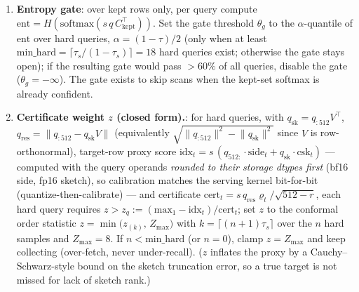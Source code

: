 \documentclass[11pt]{article}
\newcommand{\kept}{\mathrm{kept}}
\begin{document}
\begin{enumerate}[itemsep=1pt]
Where an engine can reach real prefill queries, use the last
$n_{\mathrm{cal}}$ of them. Where it cannot --- an attention backend sees MLA
prefill on the un-absorbed path, $[\,\cdot\,,H,192]$, and absorbing to the
576-dim index needs $W_{kc}$, a model weight --- calibrate instead on the
request's first $n_{\mathrm{cal}}$ \emph{decode} queries, which arrive already
absorbed. Recall stays inactive for those steps, which is the price. On the
port this restored $n_{\mathrm{hard}}$ to $3$--$63$ per layer, per-layer
calibrated $z$ landing continuously in $[0, Z_{\max}]$, and firing on $0.021\%$ of the archive
--- the reference's regime. Decode queries are arguably the better calibration
set regardless: they are the distribution recall actually serves.
\item \textbf{Entropy gate}: over kept rows only, per query compute
$\mathrm{ent} = H(\mathrm{softmax}(s\,q\,C_{\kept}^{\!\top}))$. Set the gate
threshold $\theta_g$ to the $\alpha$-quantile of $\mathrm{ent}$ over hard
queries, $\alpha=(1-\tau)/2$ (only when at least
$\mathrm{min\_hard}=\lceil\tau_s/(1-\tau_s)\rceil=18$ hard queries exist;
otherwise the gate stays open); if the resulting gate would pass $>60\%$ of
all queries, disable the gate ($\theta_g=-\infty$). The gate exists to skip
scans when the kept-set softmax is already confident.
\item \textbf{Certificate weight $z$ (closed form).}: for hard queries, with
$q_{\mathrm{sk}} = q_{:512}V^{\!\top}$,
$q_{\mathrm{res}} = \lVert q_{:512} - q_{\mathrm{sk}}V\rVert$
(equivalently $\sqrt{\lVert q_{:512}\rVert^2 - \lVert q_{\mathrm{sk}}\rVert^2}$
since $V$ is row-orthonormal), target-row
proxy score
$\mathrm{idx}_t = s\,(q_{512:}\!\cdot\!\mathrm{side}_t +
q_{\mathrm{sk}}\!\cdot\!\mathrm{csk}_t)$ --- computed with the query operands
\emph{rounded to their storage dtypes first} (bf16 side, fp16 sketch), so
calibration matches the serving kernel bit-for-bit (quantize-then-calibrate)
--- and certificate
$\mathrm{cert}_t = s\, q_{\mathrm{res}}\varrho_t / \sqrt{512-r}$,
each hard query requires $z > z_q := (\mathrm{max}_1 - \mathrm{idx}_t) /
\mathrm{cert}_t$; set $z$ to the conformal order statistic
$z = \min\big(z_{(k)},\, Z_{\max}\big)$ with
$k = \lceil (n{+}1)\tau_s \rceil$ over the $n$ hard samples and
$Z_{\max}=8$. If $n < \mathrm{min\_hard}$ (or $n=0$), clamp $z = Z_{\max}$
and keep collecting (over-fetch, never under-recall). ($z$ inflates the
proxy by a Cauchy--Schwarz-style bound on the sketch truncation error, so a
true target is not missed for lack of sketch rank.)
\end{enumerate}
\end{document}
